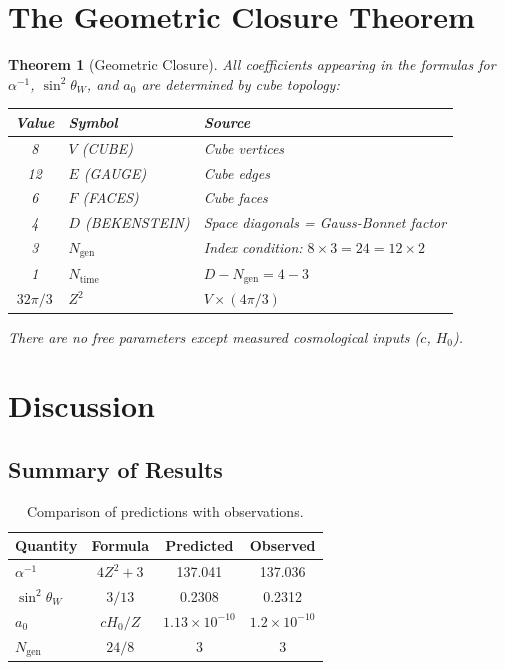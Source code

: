 \documentclass[twocolumn,showpacs,preprintnumbers,amsmath,amssymb,prd]{revtex4-2}
\newtheorem{theorem}{Theorem}[section]
\begin{document}
\section{The Geometric Closure Theorem}

\begin{theorem}[Geometric Closure]
\label{thm:closure}
All coefficients appearing in the formulas for $\alpha^{-1}$, $\sin^2\theta_W$, and $a_0$ are determined by cube topology:
\begin{center}
\begin{tabular}{|c|l|l|}
\hline
Value & Symbol & Source \\
\hline
8 & $V$ (CUBE) & Cube vertices \\
12 & $E$ (GAUGE) & Cube edges \\
6 & $F$ (FACES) & Cube faces \\
4 & $D$ (BEKENSTEIN) & Space diagonals = Gauss-Bonnet factor \\
3 & $N_{\text{gen}}$ & Index condition: $8 \times 3 = 24 = 12 \times 2$ \\
1 & $N_{\text{time}}$ & $D - N_{\text{gen}} = 4 - 3$ \\
$32\pi/3$ & $Z^2$ & $V \times (4\pi/3)$ \\
\hline
\end{tabular}
\end{center}
There are no free parameters except measured cosmological inputs ($c$, $H_0$).
\end{theorem}

\section{Discussion}

\subsection{Summary of Results}

\begin{table}[h]
\centering
\begin{tabular}{|l|c|c|c|}
\hline
Quantity & Formula & Predicted & Observed \\
\hline
$\alpha^{-1}$ & $4Z^2 + 3$ & 137.041 & 137.036 \\
$\sin^2\theta_W$ & $3/13$ & 0.2308 & 0.2312 \\
$a_0$ & $cH_0/Z$ & $1.13 \times 10^{-10}$ & $1.2 \times 10^{-10}$ \\
$N_{\text{gen}}$ & $24/8$ & 3 & 3 \\
\hline
\end{tabular}
\caption{Comparison of predictions with observations.}
\end{table}
\end{document}
